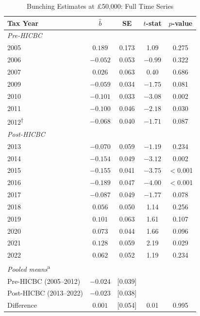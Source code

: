 \documentclass[12pt]{article}
\newcommand{\bhat}{\hat{b}}
\begin{document}
\begin{table}[H]
\centering
\caption{Bunching Estimates at \pounds50,000: Full Time Series}
\label{tab:main_bunching}
\begin{threeparttable}
\begin{tabular}{lcccc}
\toprule
Tax Year & $\bhat$ & SE & $t$-stat & $p$-value \\
\midrule
\multicolumn{5}{l}{\emph{Pre-HICBC}} \\
2005 & $0.189$ & 0.173 & 1.09 & 0.275 \\
2006 & $-0.052$ & 0.053 & $-0.99$ & 0.322 \\
2007 & $0.026$ & 0.063 & 0.40 & 0.686 \\
2009 & $-0.059$ & 0.034 & $-1.75$ & 0.081 \\
2010 & $-0.101$ & 0.033 & $-3.08$ & 0.002 \\
2011 & $-0.100$ & 0.046 & $-2.18$ & 0.030 \\
2012\textsuperscript{$\dagger$} & $-0.068$ & 0.040 & $-1.71$ & 0.087 \\[0.3em]
\multicolumn{5}{l}{\emph{Post-HICBC}} \\
2013 & $-0.070$ & 0.059 & $-1.19$ & 0.234 \\
2014 & $-0.154$ & 0.049 & $-3.12$ & 0.002 \\
2015 & $-0.155$ & 0.041 & $-3.75$ & $<$0.001 \\
2016 & $-0.189$ & 0.047 & $-4.00$ & $<$0.001 \\
2017 & $-0.087$ & 0.049 & $-1.77$ & 0.078 \\
2018 & $0.056$ & 0.050 & 1.14 & 0.256 \\
2019 & $0.101$ & 0.063 & 1.61 & 0.107 \\
2020 & $0.073$ & 0.044 & 1.66 & 0.096 \\
2021 & $0.128$ & 0.059 & 2.19 & 0.029 \\
2022 & $0.062$ & 0.052 & 1.19 & 0.234 \\[0.3em]
\multicolumn{5}{l}{\emph{Pooled means}\textsuperscript{a}} \\
Pre-HICBC (2005--2012) & $-0.024$ & [0.039] & & \\
Post-HICBC (2013--2022) & $-0.023$ & [0.038] & & \\
Difference & $0.001$ & [0.054] & 0.01 & 0.995 \\
\bottomrule
\end{tabular}
\begin{tablenotes}[flushleft]
\small

\end{tablenotes}
\end{threeparttable}
\end{table}
\end{document}

